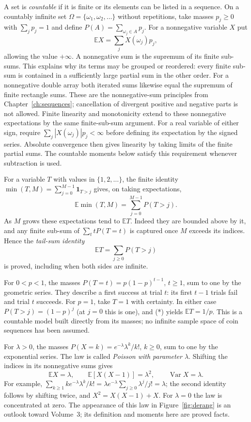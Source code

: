 A set is \emph{countable} if it is finite or its elements can be listed in a sequence. On a countably infinite set $\Omega=\{\omega_1,\omega_2,\ldots\}$ without repetitions, take masses
$p_j\ge0$ with $\sum_jp_j=1$ and define
$P(A)=\sum_{\omega_j\in A}p_j$. For a nonnegative variable $X$ put
\[
 \mathbb EX=\sum_j X(\omega_j)p_j,
\]
allowing the value $+\infty$. A nonnegative sum is the supremum of its finite
sub-sums. This explains why its terms may be grouped or reordered: every finite
sub-sum is contained in a sufficiently large partial sum in the other order.
For a nonnegative double array both iterated sums likewise equal the supremum
of finite rectangle sums. These are the nonnegative-sum principles from
Chapter~\ref{ch:sequences}; cancellation of divergent positive and negative
parts is not allowed. Finite linearity and monotonicity extend to these
nonnegative expectations by the same finite-sub-sum argument. For a real variable of either sign, require $\sum_j|X(\omega_j)|p_j<\infty$ before defining its expectation by the signed series. Absolute convergence then gives linearity by taking limits of the finite partial sums. The countable moments below satisfy this requirement whenever subtraction is used.

For a variable $T$ with values in $\{1,2,\ldots\}$, the finite identity
$\min(T,M)=\sum_{j=0}^{M-1}\mathbf1_{T>j}$ gives, on taking expectations,
\[
 \mathbb E\min(T,M)=\sum_{j=0}^{M-1}P(T>j).
\]
As $M$ grows these expectations tend to $\mathbb ET$. Indeed they are bounded
above by it, and any finite sub-sum of $\sum_t tP(T=t)$ is captured once $M$
exceeds its indices. Hence the \emph{tail-sum identity}
\[
 \mathbb ET=\sum_{j\ge0}P(T>j)                                      \tag{*}
\]
is proved, including when both sides are infinite.

\begin{examplex}
For $0<p<1$, the masses $P(T=t)=p(1-p)^{t-1}$, $t\ge1$, sum to one
by the geometric series. They describe a first success at trial $t$: its first
$t-1$ trials fail and trial $t$ succeeds. For $p=1$, take $T=1$ with certainty.
In either case $P(T>j)=(1-p)^j$ (at $j=0$ this is one), and (*) yields
$\mathbb ET=1/p$. This is a countable model built directly from its masses;
no infinite sample space of coin sequences has been assumed.
\end{examplex}

\begin{examplex}
For $\lambda>0$, the masses $P(X=k)=e^{-\lambda}\lambda^k/k!$,
$k\ge0$, sum to one by the exponential series. The law is called
\emph{Poisson with parameter $\lambda$}. Shifting the indices in its
nonnegative sums gives
\[
 \mathbb EX=\lambda,\qquad
 \mathbb E[X(X-1)]=\lambda^2,
 \qquad \operatorname{Var}X=\lambda.
\]
For example,
$\sum_{k\ge1}k e^{-\lambda}\lambda^k/k!
=\lambda e^{-\lambda}\sum_{j\ge0}\lambda^j/j!=\lambda$;
the second identity follows by shifting twice, and
$X^2=X(X-1)+X$. For $\lambda=0$ the law is concentrated at zero.
The appearance of this law in Figure~\ref{fig:derang} is an outlook toward
Volume~3; its definition and moments here are proved facts.
\end{examplex}

